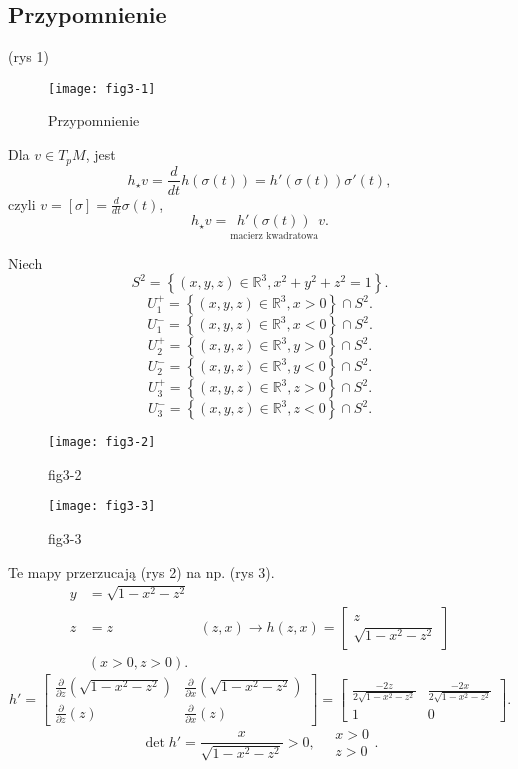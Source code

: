 \documentclass[../main.tex]{subfiles}
\begin{document}
    \subsection{Przypomnienie}
    (rys 1)\\
    \begin{figure}[h]
        \centering
        \texttt{[image: fig3-1]}
        \caption{Przypomnienie}
        \label{fig:fig3-1}
    \end{figure}
    Dla $v\in T_pM$, jest
    \[
        h_\star v = \frac{d}{dt}h(\sigma(t)) = h'(\sigma(t))\sigma'(t)
    ,\]
czyli $v = [\sigma] = \frac{d}{dt}\sigma(t)$,
\[
    h_\star v = \underset{\text{macierz kwadratowa}}{h'(\sigma(t))}v
.\]
\begin{przyklad}
    Niech
     \[
         S^2 = \left\{ (x,y,z)\in \mathbb{R}^3, x^2 + y^2 + z^2 = 1 \right\}
    .\]
\[
    U_1^+ = \left\{ (x,y,z)\in \mathbb{R}^3, x > 0 \right\} \cap S^2
.\]
\[
    U_1^- = \left\{ (x,y,z)\in \mathbb{R}^3, x < 0 \right\} \cap S^2
.\]
\[
    U_2^+ = \left\{ (x,y,z)\in \mathbb{R}^3, y > 0 \right\} \cap S^2
.\]
\[
    U_2^- = \left\{ (x,y,z)\in \mathbb{R}^3, y < 0 \right\} \cap S^2
.\]
\[
    U_3^+ = \left\{ (x,y,z)\in \mathbb{R}^3, z > 0 \right\} \cap S^2
.\]
\[
    U_3^- = \left\{ (x,y,z)\in \mathbb{R}^3, z < 0 \right\} \cap S^2
.\]
\begin{figure}[h]
    \centering
    \texttt{[image: fig3-2]}
    \caption{fig3-2}
    \label{fig:fig3-2}
\end{figure}
\begin{figure}[h]
    \centering
    \texttt{[image: fig3-3]}
    \caption{fig3-3}
    \label{fig:fig3-3}
\end{figure}
Te mapy przerzucają (rys 2) na np. (rys 3).\\
\begin{align*}
    y &= \sqrt{1-x^2-z^2}\\
    z &= z &(z,x) \to h(z,x) = \begin{bmatrix} z\\ \sqrt{1 - x^2 - z^2} \end{bmatrix}\\
    &(x > 0, z > 0)
.\end{align*}
\[
    h' = \begin{bmatrix} \frac{\partial }{\partial z} \left( \sqrt{1-x^2-z^2}  \right) & \frac{\partial }{\partial x} \left( \sqrt{1-x^2-z^2}  \right) \\ \frac{\partial }{\partial z} \left( z \right) & \frac{\partial }{\partial x} (z) \end{bmatrix} = \begin{bmatrix} \frac{-2z}{2\sqrt{1-x^2-z^2} } & \frac{-2x}{2\sqrt{1-x^2-z^2} }\\ 1&0 \end{bmatrix}
.\]
\[
    \det h' = \frac{x}{\sqrt{1-x^2-z^2} } > 0,\quad \begin{matrix}x>0\\z>0\end{matrix}
.\]
\end{przyklad}
\end{document}
